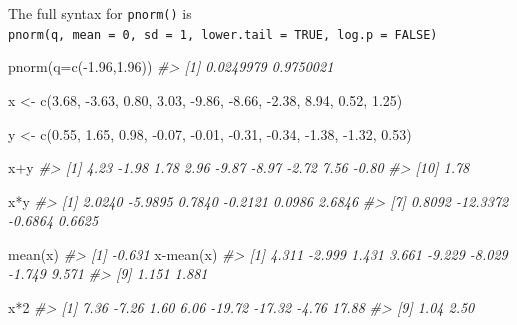 \documentclass[
]{book}
\newenvironment{Shaded}{\begin{snugshade}}{\end{snugshade}}
\newcommand{\AttributeTok}[1]{\textcolor[rgb]{0.77,0.63,0.00}{#1}}
\newcommand{\CommentTok}[1]{\textcolor[rgb]{0.56,0.35,0.01}{\textit{#1}}}
\newcommand{\DecValTok}[1]{\textcolor[rgb]{0.00,0.00,0.81}{#1}}
\newcommand{\FloatTok}[1]{\textcolor[rgb]{0.00,0.00,0.81}{#1}}
\newcommand{\FunctionTok}[1]{\textcolor[rgb]{0.00,0.00,0.00}{#1}}
\newcommand{\NormalTok}[1]{#1}
\newcommand{\OtherTok}[1]{\textcolor[rgb]{0.56,0.35,0.01}{#1}}
\newcommand{\SpecialCharTok}[1]{\textcolor[rgb]{0.00,0.00,0.00}{#1}}
\begin{document}
The full syntax for \texttt{pnorm()} is \texttt{pnorm(q,\ mean\ =\ 0,\ sd\ =\ 1,\ lower.tail\ =\ TRUE,\ log.p\ =\ FALSE)}

\begin{Shaded}
\begin{Highlighting}[]
\FunctionTok{pnorm}\NormalTok{(}\AttributeTok{q=}\FunctionTok{c}\NormalTok{(}\SpecialCharTok{{-}}\FloatTok{1.96}\NormalTok{,}\FloatTok{1.96}\NormalTok{))}
\CommentTok{\#\textgreater{} [1] 0.0249979 0.9750021}
\end{Highlighting}
\end{Shaded}

\begin{Shaded}
\begin{Highlighting}[]
\NormalTok{x }\OtherTok{\textless{}{-}} \FunctionTok{c}\NormalTok{(}\FloatTok{3.68}\NormalTok{, }\SpecialCharTok{{-}}\FloatTok{3.63}\NormalTok{, }\FloatTok{0.80}\NormalTok{, }\FloatTok{3.03}\NormalTok{, }\SpecialCharTok{{-}}\FloatTok{9.86}\NormalTok{, }\SpecialCharTok{{-}}\FloatTok{8.66}\NormalTok{, }
    \SpecialCharTok{{-}}\FloatTok{2.38}\NormalTok{, }\FloatTok{8.94}\NormalTok{, }\FloatTok{0.52}\NormalTok{, }\FloatTok{1.25}\NormalTok{) }

\NormalTok{y }\OtherTok{\textless{}{-}} \FunctionTok{c}\NormalTok{(}\FloatTok{0.55}\NormalTok{, }\FloatTok{1.65}\NormalTok{, }\FloatTok{0.98}\NormalTok{, }\SpecialCharTok{{-}}\FloatTok{0.07}\NormalTok{, }\SpecialCharTok{{-}}\FloatTok{0.01}\NormalTok{, }\SpecialCharTok{{-}}\FloatTok{0.31}\NormalTok{, }
    \SpecialCharTok{{-}}\FloatTok{0.34}\NormalTok{, }\SpecialCharTok{{-}}\FloatTok{1.38}\NormalTok{, }\SpecialCharTok{{-}}\FloatTok{1.32}\NormalTok{, }\FloatTok{0.53}\NormalTok{)}

\NormalTok{x}\SpecialCharTok{+}\NormalTok{y}
\CommentTok{\#\textgreater{}  [1]  4.23 {-}1.98  1.78  2.96 {-}9.87 {-}8.97 {-}2.72  7.56 {-}0.80}
\CommentTok{\#\textgreater{} [10]  1.78}

\NormalTok{x}\SpecialCharTok{*}\NormalTok{y}
\CommentTok{\#\textgreater{}  [1]   2.0240  {-}5.9895   0.7840  {-}0.2121   0.0986   2.6846}
\CommentTok{\#\textgreater{}  [7]   0.8092 {-}12.3372  {-}0.6864   0.6625}
\end{Highlighting}
\end{Shaded}

\begin{Shaded}
\begin{Highlighting}[]
\FunctionTok{mean}\NormalTok{(x)}
\CommentTok{\#\textgreater{} [1] {-}0.631}
\NormalTok{x}\SpecialCharTok{{-}}\FunctionTok{mean}\NormalTok{(x)}
\CommentTok{\#\textgreater{}  [1]  4.311 {-}2.999  1.431  3.661 {-}9.229 {-}8.029 {-}1.749  9.571}
\CommentTok{\#\textgreater{}  [9]  1.151  1.881}

\NormalTok{x}\SpecialCharTok{*}\DecValTok{2}
\CommentTok{\#\textgreater{}  [1]   7.36  {-}7.26   1.60   6.06 {-}19.72 {-}17.32  {-}4.76  17.88}
\CommentTok{\#\textgreater{}  [9]   1.04   2.50}
\end{Highlighting}
\end{Shaded}
\end{document}
